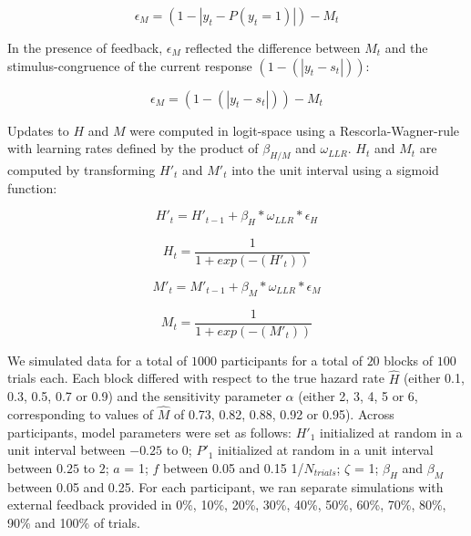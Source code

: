 \documentclass[
]{article}
\begin{document}
\begin{equation}
\epsilon_M = (1-|y_t - P(y_t = 1)|) - M_t
\end{equation}

In the presence of feedback, \(\epsilon_M\) reflected the difference
between \(M_t\) and the stimulus-congruence of the current response
\((1- (|y_t - s_t|))\):

\begin{equation}
\epsilon_M = (1- (|y_t - s_t|)) - M_t
\end{equation}

Updates to \(H\) and \(M\) were computed in logit-space using a
Rescorla-Wagner-rule with learning rates defined by the product of
\(\beta_{H/M}\) and \(\omega_{LLR}\). \(H_t\) and \(M_t\) are computed
by transforming \(H'_t\) and \(M'_t\) into the unit interval using a
sigmoid function:

\begin{equation}
H'_t = H'_{t-1} + \beta_H *\omega_{LLR} * \epsilon_H
\end{equation}

\begin{equation}
H_t = \frac{1}{1+exp(-(H'_t))}
\end{equation}

\begin{equation}
M'_t = M'_{t-1} + \beta_M *\omega_{LLR} * \epsilon_M
\end{equation}

\begin{equation}
M_t = \frac{1}{1+exp(-(M'_t))}
\end{equation}

We simulated data for a total of \(1000\) participants for a total of
\(20\) blocks of \(100\) trials each. Each block differed with respect
to the true hazard rate \(\hat{H}\) (either 0.1, 0.3, 0.5, 0.7 or 0.9)
and the sensitivity parameter \(\alpha\) (either 2, 3, 4, 5 or 6,
corresponding to values of \(\hat{M}\) of 0.73, 0.82, 0.88, 0.92 or
0.95). Across participants, model parameters were set as follows:
\(H'_1\) initialized at random in a unit interval between \(-0.25\) to
\(0\); \(P'_1\) initialized at random in a unit interval between
\(0.25\) to \(2\); \(a\) = 1; \(f\) between 0.05 and 0.15
1/\(N_{trials}\); \(\zeta\) = 1; \(\beta_H\) and \(\beta_M\) between
0.05 and 0.25. For each participant, we ran separate simulations with
external feedback provided in 0\%, 10\%, 20\%, 30\%, 40\%, 50\%, 60\%,
70\%, 80\%, 90\% and 100\% of trials.

\newpage
\end{document}

